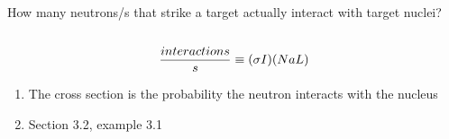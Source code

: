 \documentclass[aspectratio=1610,pdftex,dvipsnames,compress,xcolor={dvipsnames}]{beamer}
\begin{document}
\begin{frame}{How many neutrons/s that strike a target actually interact with target nuclei?}
\begin{columns}[t]
\begin{column}{0.45\textwidth}
            \begin{equation}
                \small
                \frac{interactions}{s} \equiv (\sigma I)(NaL)
            \end{equation}

            \vspace*{\fill}

            \begin{enumerate}[series=outerlist,topsep=0pt,itemsep=7pt,leftmargin=*,label=(\arabic*)]
                \item[]\small The cross section is the probability the neutron interacts with the nucleus
                \item[]\small Section 3.2, example 3.1 
            \end{enumerate}
        \end{column}

    \end{columns}
\end{frame}
\end{document}
